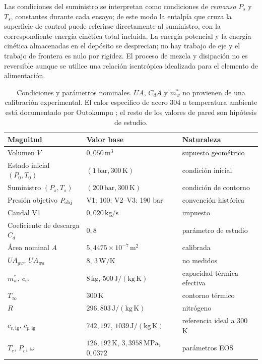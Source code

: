 \documentclass[11pt,letterpaper]{article}
\begin{document}
Las condiciones del suministro se interpretan como condiciones de \emph{remanso} $P_s$ y $T_s$, constantes durante cada ensayo; de este modo la entalpía que cruza la superficie de control puede referirse directamente al suministro, con la correspondiente energía cinética total incluida. La energía potencial y la energía cinética almacenadas en el depósito se desprecian; no hay trabajo de eje y el trabajo de frontera es nulo por rigidez. El proceso de mezcla y disipación no es reversible aunque se utilice una relación isentrópica idealizada para el elemento de alimentación.

\begin{table}[!t]\centering\small
\begin{tabular}{lll}\toprule
Magnitud & Valor base & Naturaleza \\\midrule
Volumen $V$ & $0,050\,\mathrm{m^3}$ & supuesto geométrico \\
Estado inicial $(P_0,T_0)$ & $(1\,\mathrm{bar},300\,\mathrm K)$ & condición inicial \\
Suministro $(P_s,T_s)$ & $(200\,\mathrm{bar},300\,\mathrm K)$ & condición de contorno \\
Presión objetivo $P_{\rm obj}$ & V1: 100; V2--V3: 190 bar & convención histórica \\
Caudal V1 & $0,020\,\mathrm{kg/s}$ & impuesto \\
Coeficiente de descarga $C_d$ & $0,8$ & parámetro de estudio \\
Área nominal $A$ & $5,4475\times10^{-7}\,\mathrm{m^2}$ & calibrada \\
$UA_{gw}$, $UA_{wa}$ & $8$, $3\,\mathrm{W/K}$ & no medidos \\
$m_w^*$, $c_w$ & $8\,\mathrm{kg}$, $500\,\mathrm{J/(kg\,K)}$ & capacidad térmica efectiva \\
$T_\infty$ & $300\,\mathrm K$ & contorno térmico \\
$R$ & $296,803\,\mathrm{J/(kg\,K)}$ & nitrógeno \\
$c_{v,\mathrm{ig}}$, $c_{p,\mathrm{ig}}$ & $742,197$, $1039\,\mathrm{J/(kg\,K)}$ & referencia ideal a 300 K \\
$T_c$, $P_c$, $\omega$ & $126,192\,\mathrm K$, $3,3958\,\mathrm{MPa}$, $0,0372$ & parámetros EOS \\\bottomrule
\end{tabular}\caption{Condiciones y parámetros nominales. $UA$, $C_dA$ y $m_w^*$ no provienen de una calibración experimental. El calor específico de acero 304 a temperatura ambiente está documentado por Outokumpu \citep{Outokumpu}; el resto de los valores de pared son hipótesis de estudio.}\label{tab:parametros}
\end{table}
\end{document}
